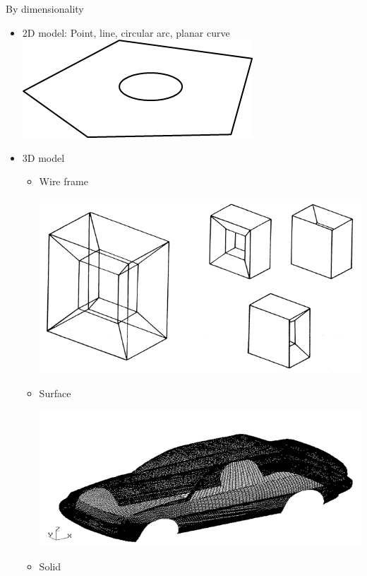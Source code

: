 \begin{frame}{By dimensionality}
\begin{itemize}
\item 2D model: Point, line, circular arc, planar curve
\includegraphics[scale=0.3]{images/CAD2dprofile.png}
\item 3D model
	\begin{itemize}
	\item Wire frame

	\includegraphics[scale=0.3]{images/CADWireframe.png}
	\item Surface

	\includegraphics[scale=0.3]{images/CADSurface.png}
	\item Solid


\end{itemize}
\end{itemize}
\end{frame}
